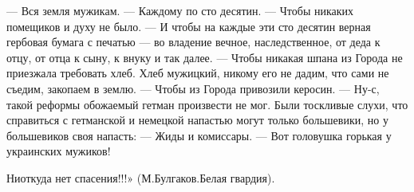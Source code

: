\obeycr
— Вся земля мужикам.
— Каждому по сто десятин.
— Чтобы никаких помещиков и духу не было.
— И чтобы на каждые эти сто десятин верная гербовая бумага с печатью — во владение вечное, наследственное, от деда к отцу, от отца к сыну, к внуку и так далее.
— Чтобы никакая шпана из Города не приезжала требовать хлеб. Хлеб мужицкий, никому его не дадим, что сами не съедим, закопаем в землю.
— Чтобы из Города привозили керосин.
— Ну-с, такой реформы обожаемый гетман произвести не мог.
Были тоскливые слухи, что справиться с гетманской и немецкой напастью могут только большевики, но у большевиков своя напасть:
— Жиды и комиссары.
— Вот головушка горькая у украинских мужиков!
\restorecr

Ниоткуда нет спасения!!!» (М.Булгаков.Белая гвардия).
